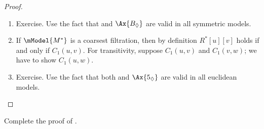 \documentclass[../../../include/open-logic-section]{subfiles}
\begin{document}
\begin{proof}
\begin{enumerate}
  \item Exercise. Use the fact that  and $\Ax{B_\Diamond}$ are
    valid in all symmetric models.
  \item If $\mModel{M^*}$ is a coarsest filtration, then by definition
    $R^*[u][v]$ holds if and only if $C_1(u,v)$. For transitivity,
    suppose $C_1(u,v)$ and $C_1(v,w)$; we have to show
    $C_1(u,w)$. 
  \item Exercise. Use the fact that both  and $\Ax{5_\Diamond}$
    are valid in all euclidean models.
\end{enumerate}
\end{proof}

\begin{prob}
  Complete the proof of .
\end{prob}
\end{document}
